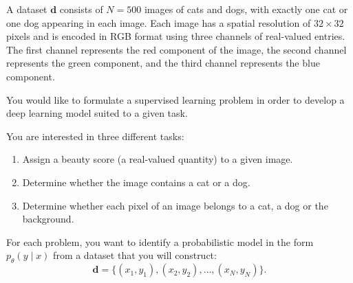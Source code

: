 \documentclass[11pt, a4paper]{exam}
\begin{document}
\begin{exercises}

A dataset $\mathbf{d}$ consists of $N=500$ images of cats and dogs, with exactly one cat or one dog appearing in each image. Each image has a spatial resolution of $32\times32$ pixels and is encoded in RGB format using three channels of real-valued entries. The first channel represents the red component of the image, the second channel represents the green component, and the third channel represents the blue component.

You would like to formulate a supervised learning problem in order to develop a deep learning model suited to a given task.

You are interested in three different tasks:
\begin{enumerate}
    \item Assign a beauty score (a real-valued quantity) to a given image.
    \item Determine whether the image contains a cat or a dog.
    \item Determine whether each pixel of an image belongs to a cat, a dog or the background.
\end{enumerate}

For each problem, you want to identify a probabilistic model in the form $p_\theta(y \mid x)$ from a dataset that you will construct:
\[
    \mathbf{d} = \{(x_1, y_1), (x_2, y_2), \ldots, (x_N, y_N)\}.
\]

\end{exercises}
\end{document}
